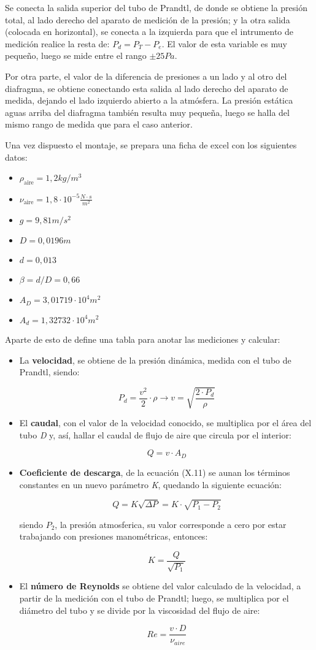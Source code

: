 Se conecta la salida superior del tubo de Prandtl, de donde se obtiene
la presión total, al lado derecho del aparato de medición de la presión;
y la otra salida (colocada en horizontal), se conecta a la izquierda
para que el intrumento de medición realice la resta de:
\(P_d =P_T - P_e\). El valor de esta variable es muy pequeño, luego se
mide entre el rango \(\pm 25Pa\).

Por otra parte, el valor de la diferencia de presiones a un lado y al
otro del diafragma, se obtiene conectando esta salida al lado derecho
del aparato de medida, dejando el lado izquierdo abierto a la atmósfera.
La presión estática aguas arriba del diafragma también resulta muy
pequeña, luego se halla del mismo rango de medida que para el caso
anterior.

Una vez dispuesto el montaje, se prepara una ficha de excel con los
siguientes datos:

\begin{itemize}
\item
  \(\rho _ {\text{aire}} = 1,2 kg/m^3\)
\item
  \(\nu _ {\text{aire}}=1,8 · 10^{-5} \frac{N·s}{m^2}\)
\item
  \(g=9,81 m/s^2\)
\item
  \(D=0,0196 m\)
\item
  \(d=0,013\)
\item
  \(\beta =d/D= 0,66\)
\item
  \(A_D = 3,01719 · 10^4 m^2\)
\item
  \(A_d = 1,32732 · 10^4 m^2\)
\end{itemize}

Aparte de esto de define una tabla para anotar las mediciones y
calcular:

\begin{itemize}
\item
  La \textbf{velocidad}, se obtiene de la presión dinámica, medida con
  el tubo de Prandtl, siendo:

  \[P_d=\frac{v^2}{2}·\rho \to v=\sqrt{\frac{2·P_d}{\rho}}\]
\item
  El \textbf{caudal}, con el valor de la velocidad conocido, se
  multiplica por el área del tubo \emph{D} y, así, hallar el caudal de
  flujo de aire que circula por el interior:

  \[Q=v·A_D\]
\item
  \textbf{Coeficiente de descarga}, de la ecuación (X.11) se aunan los
  términos constantes en un nuevo parámetro \emph{K}, quedando la
  siguiente ecuación:

  \[Q=K\sqrt{\Delta P} = K·\sqrt{P_1-P_2}\]

  siendo \(P_2\), la presión atmosferica, su valor corresponde a cero
  por estar trabajando con presiones manométricas, entonces:

  \[K=\frac{Q}{\sqrt{P_1}}\]
\item
  El \textbf{número de Reynolds} se obtiene del valor calculado de la
  velocidad, a partir de la medición con el tubo de Prandtl; luego, se
  multiplica por el diámetro del tubo y se divide por la viscosidad del
  flujo de aire:

  \[Re= \frac{v·D}{\nu _{aire}}\]
\end{itemize}

